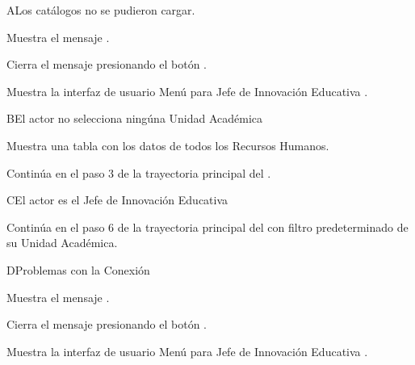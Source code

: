 \begin{UCtrayectoriaA}{A}{Los catálogos no se pudieron cargar.}

    \UCpaso Muestra el mensaje .

    \UCpaso[\UCactor] Cierra el mensaje presionando el botón .

    \UCpaso Muestra la interfaz de usuario Menú para Jefe de Innovación Educativa .


\end{UCtrayectoriaA}


\begin{UCtrayectoriaA}{B}{El actor no selecciona ningúna Unidad Académica}

    \UCpaso Muestra una tabla con los datos de todos los Recursos Humanos.

    \UCpaso Continúa en el paso 3 de la trayectoria principal del .

\end{UCtrayectoriaA}


\begin{UCtrayectoriaA}{C}{El actor es el Jefe de Innovación Educativa}

    \UCpaso Continúa en el paso 6 de la trayectoria principal del  con filtro predeterminado de su Unidad Académica.

\end{UCtrayectoriaA}



\begin{UCtrayectoriaA}{D}{Problemas con la Conexión}

    \UCpaso Muestra el mensaje .

    \UCpaso[\UCactor] Cierra el mensaje presionando el botón .

\UCpaso Muestra la interfaz de usuario Menú para Jefe de Innovación Educativa .


\end{UCtrayectoriaA}